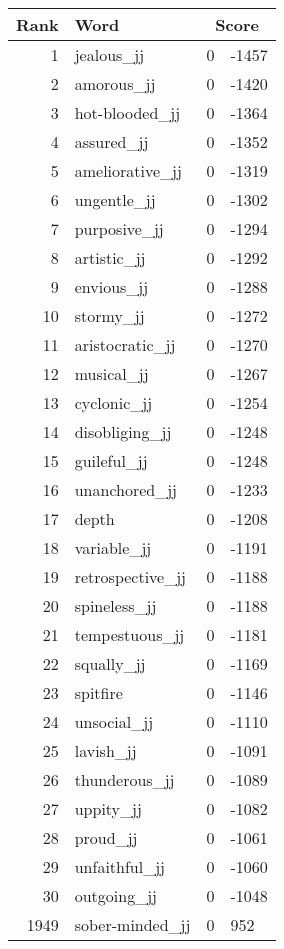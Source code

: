 \begin{longtable}[!htbp]{| rlr@{.}l |}
    \hline
    \textbf{Rank} & \textbf{Word} & \multicolumn{2}{c|}{\textbf{Score}} \\
    \hline
    \endhead
    1 & jealous\_jj & 0 & -1457 \\
    2 & amorous\_jj & 0 & -1420 \\
    3 & hot-blooded\_jj & 0 & -1364 \\
    4 & assured\_jj & 0 & -1352 \\
    5 & ameliorative\_jj & 0 & -1319 \\
    6 & ungentle\_jj & 0 & -1302 \\
    7 & purposive\_jj & 0 & -1294 \\
    8 & artistic\_jj & 0 & -1292 \\
    9 & envious\_jj & 0 & -1288 \\
    10 & stormy\_jj & 0 & -1272 \\
    11 & aristocratic\_jj & 0 & -1270 \\
    12 & musical\_jj & 0 & -1267 \\
    13 & cyclonic\_jj & 0 & -1254 \\
    14 & disobliging\_jj & 0 & -1248 \\
    15 & guileful\_jj & 0 & -1248 \\
    16 & unanchored\_jj & 0 & -1233 \\
    17 & depth & 0 & -1208 \\
    18 & variable\_jj & 0 & -1191 \\
    19 & retrospective\_jj & 0 & -1188 \\
    20 & spineless\_jj & 0 & -1188 \\
    21 & tempestuous\_jj & 0 & -1181 \\
    22 & squally\_jj & 0 & -1169 \\
    23 & spitfire & 0 & -1146 \\
    24 & unsocial\_jj & 0 & -1110 \\
    25 & lavish\_jj & 0 & -1091 \\
    26 & thunderous\_jj & 0 & -1089 \\
    27 & uppity\_jj & 0 & -1082 \\
    28 & proud\_jj & 0 & -1061 \\
    29 & unfaithful\_jj & 0 & -1060 \\
    30 & outgoing\_jj & 0 & -1048 \\
    1949 & sober-minded\_jj & 0 & 952 \\

\end{longtable}
